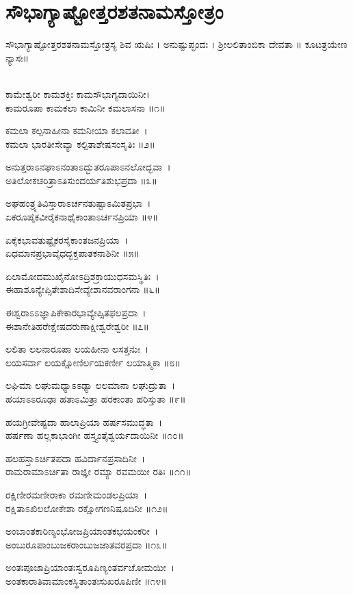 \section{ಸೌಭಾಗ್ಯಾಷ್ಟೋತ್ತರಶತನಾಮಸ್ತೋತ್ರಂ }
ಸೌಭಾಗ್ಯಾಷ್ಟೋತ್ತರಶತನಾಮಸ್ತೋತ್ರಸ್ಯ ಶಿವ ಋಷಿಃ । ಅನುಷ್ಟುಪ್ಛಂದಃ । ಶ್ರೀಲಲಿತಾಂಬಿಕಾ  ದೇವತಾ ॥
ಕೂಟತ್ರಯೇಣ ನ್ಯಾಸಃ॥

\\
ಕಾಮೇಶ್ವರೀ ಕಾಮಶಕ್ತಿಃ ಕಾಮಸೌಭಾಗ್ಯದಾಯಿನೀ।\\
ಕಾಮರೂಪಾ ಕಾಮಕಲಾ ಕಾಮಿನೀ ಕಮಲಾಸನಾ ॥೧॥

ಕಮಲಾ ಕಲ್ಪನಾಹೀನಾ ಕಮನೀಯಾ ಕಲಾವತೀ~।\\
ಕಮಲಾ ಭಾರತೀಸೇವ್ಯಾ ಕಲ್ಪಿತಾಶೇಷಸಂಸೃತಿಃ ॥೨॥

ಅನುತ್ತರಾಽನಘಾಽನಂತಾಽದ್ಭುತರೂಪಾಽನಲೋದ್ಭವಾ~।\\
ಅತಿಲೋಕಚರಿತ್ರಾಽತಿಸುಂದರ್ಯತಿಶುಭಪ್ರದಾ ॥೩॥

ಅಘಹಂತ್ರ್ಯತಿವಿಸ್ತಾರಾಽರ್ಚನತುಷ್ಟಾಽಮಿತಪ್ರಭಾ~।\\
ಏಕರೂಪೈಕವೀರೈಕನಾಥೈಕಾಂತಾಽರ್ಚನಪ್ರಿಯಾ ॥೪॥

ಏಕೈಕಭಾವತುಷ್ಟೈಕರಸೈಕಾಂತಜನಪ್ರಿಯಾ~।\\
ಏಧಮಾನಪ್ರಭಾವೈಧದ್ಭಕ್ತಪಾತಕನಾಶಿನೀ ॥೫॥

ಏಲಾಮೋದಮುಖೈನೋಽದ್ರಿಶಕ್ರಾಯುಧಸಮಸ್ಥಿತಿಃ~।\\
ಈಹಾಶೂನ್ಯೇಪ್ಸಿತೇಶಾದಿಸೇವ್ಯೇಶಾನವರಾಂಗನಾ ॥೬॥

ಈಶ್ವರಾಽಽಜ್ಞಾಪಿಕೇಕಾರಭಾವ್ಯೇಪ್ಸಿತಫಲಪ್ರದಾ~।\\
ಈಶಾನೇತಿಹರೇಕ್ಷೇಷದರುಣಾಕ್ಷೀಶ್ವರೇಶ್ವರೀ ॥೭॥

ಲಲಿತಾ ಲಲನಾರೂಪಾ ಲಯಹೀನಾ ಲಸತ್ತನುಃ~।\\
ಲಯಸರ್ವಾ ಲಯಕ್ಷೋಣಿರ್ಲಯಕರ್ಣೀ ಲಯಾತ್ಮಿಕಾ ॥೮॥

ಲಘಿಮಾ ಲಘುಮಧ್ಯಾಽಽಢ್ಯಾ ಲಲಮಾನಾ ಲಘುದ್ರುತಾ~।\\
ಹಯಾಽಽರೂಢಾ ಹತಾಽಮಿತ್ರಾ ಹರಕಾಂತಾ ಹರಿಸ್ತುತಾ ॥೯॥

ಹಯಗ್ರೀವೇಷ್ಟದಾ ಹಾಲಾಪ್ರಿಯಾ ಹರ್ಷಸಮುದ್ಧತಾ~।\\
ಹರ್ಷಣಾ ಹಲ್ಲಕಾಭಾಂಗೀ ಹಸ್ತ್ಯಂತೈಶ್ವರ್ಯದಾಯಿನೀ ॥೧೦॥

ಹಲಹಸ್ತಾಽರ್ಚಿತಪದಾ ಹವಿರ್ದಾನಪ್ರಸಾದಿನೀ~।\\
ರಾಮರಾಮಾಽರ್ಚಿತಾ ರಾಜ್ಞೀ ರಮ್ಯಾ ರವಮಯೀ ರತಿಃ ॥೧೧॥

ರಕ್ಷಿಣೀರಮಣೀರಾಕಾ ರಮಣೀಮಂಡಲಪ್ರಿಯಾ~।\\
ರಕ್ಷಿತಾಽಖಿಲಲೋಕೇಶಾ ರಕ್ಷೋಗಣನಿಷೂದಿನೀ ॥೧೨॥

ಅಂಬಾಂತಕಾರಿಣ್ಯಂಭೋಜಪ್ರಿಯಾಂತಕಭಯಂಕರೀ~।\\
ಅಂಬುರೂಪಾಂಬುಜಕರಾಂಬುಜಜಾತವರಪ್ರದಾ ॥೧೩॥

ಅಂತಃಪೂಜಾಪ್ರಿಯಾಂತಃಸ್ವರೂಪಿಣ್ಯಂತರ್ವಚೋಮಯೀ~।\\
ಅಂತಕಾರಾತಿವಾಮಾಂಕಸ್ಥಿತಾಂತಃಸುಖರೂಪಿಣೀ ॥೧೪॥

